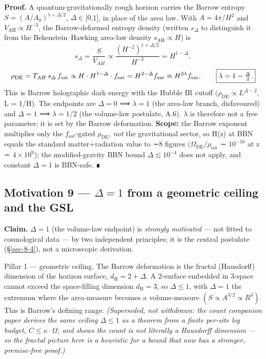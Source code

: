 \documentclass[preprint,12pt]{elsarticle}
\begin{document}
\textbf{Proof.} A quantum-gravitationally rough horizon carries the
Barrow entropy \(S = (A/A_{0})^{1+\Delta /2}\),
\(\Delta  \in  [0\),1{]}, in place of the area law. With
\(A = 4\pi /H^{2}\) and \(V_\mathrm{AH} \propto  H^{-3}\), the
Barrow-deformed entropy density (written \(s_\Delta\) to distinguish it
from the Bekenstein--Hawking area-law density
\(s_\mathrm{AH} \propto  H\)) is
\begin{equation}s_{\Delta} = \frac{S}{V_{AH}} \propto \frac{(H^{-2})^{1+\Delta/2}}{H^{-3}} = H^{1-\Delta},\end{equation}
\begin{equation}\rho_{\rm DE} = T_{AH}\,s_{\Delta}\,f_{\rm sat} \propto H\cdot H^{1-\Delta}\cdot f_{\rm sat}
= H^{2-\Delta}f_{\rm sat} \equiv H^{2\lambda}f_{\rm sat}, \qquad \boxed{\lambda = 1 - \tfrac{\Delta}{2}.}\end{equation}
This is Barrow holographic dark energy with the Hubble IR cutoff
\((\rho _\mathrm{DE} \propto  L^{\Delta -2}\), L = 1/H). The endpoints
are \(\Delta  = 0\) ⟹ \(\lambda  = 1\) (the area-law branch,
disfavoured) and \(\Delta  = 1\) ⟹ \(\lambda  = 1/2\) (the volume-law
postulate, A.6). \(\lambda\) is therefore not a free parameter; it is
set by the Barrow deformation. \textbf{Scope:} the Barrow exponent
multiplies only the \(f_{\mathrm{sat}}\)-gated \(\rho _\mathrm{DE}\),
\emph{not} the gravitational sector, so H(z) at BBN equals the standard
matter+radiation value to ∼8 figures
\((\Omega _\mathrm{DE}/\rho _{\mathrm{tot}}\) ∼ \(10^{-16}\) at z ∼
\(4\times 10^{9}\)); the modified-gravity BBN bound
\(\Delta  \lesssim  10^{-4}\) does not apply, and constant
\(\Delta  = 1\) is BBN-safe. ∎

\subsection{\texorpdfstring{Motivation 9 --- \(\Delta  = 1\) from a
geometric ceiling and the
GSL}{Motivation 9 --- \textbackslash Delta  = 1 from a geometric ceiling and the GSL}}\label{sec-A-6}

\textbf{Claim.} \(\Delta  = 1\) (the volume-law endpoint) is
\emph{strongly motivated} --- not fitted to cosmological data --- by two
independent principles; it is the central postulate (§\ref{sec-8-4}),
not a microscopic derivation.

Pillar 1 --- geometric ceiling. The Barrow deformation is the fractal
(Hausdorff) dimension of the horizon surface,
\(d_{\mathrm{H}} = 2 + \Delta\). A 2-surface embedded in 3-space cannot
exceed the space-filling dimension \(d_{\mathrm{H}} = 3\), so
\(\Delta  \leq  1\), with \(\Delta  = 1\) the extremum where the
area-measure becomes a volume-measure
\((S \propto  A^{3/2} \propto  R^{3})\). This is Barrow's defining
range. \emph{(Superseded, not withdrawn: the count companion paper
\citep{Pandev:2026count} derives the same ceiling \(\Delta  \leq  1\) as
a theorem from a finite per-site leg budget,
\(C \leq  \kappa \cdot\)\textbar{}\(\Omega\)\textbar, and shows the
count is not literally a Hausdorff dimension --- so the fractal picture
here is a heuristic for a bound that now has a stronger, premise-free
proof.)}
\end{document}
